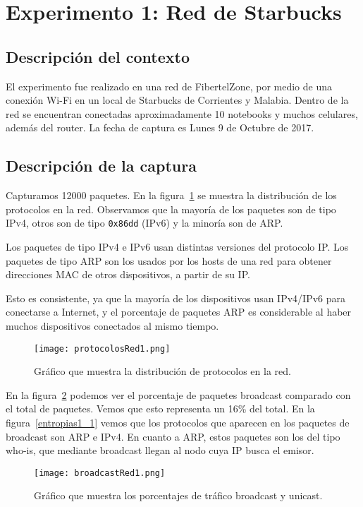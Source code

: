 \section{Experimento 1: Red de Starbucks}

\subsection{Descripción del contexto}

El experimento fue realizado en una red de FibertelZone, por medio de una conexión Wi-Fi en un local de Starbucks de Corrientes y Malabia. Dentro de la red se encuentran conectadas aproximadamente 10 notebooks y muchos celulares, además del router. La fecha de captura es Lunes 9 de Octubre de 2017.

\subsection{Descripción de la captura}

Capturamos 12000 paquetes. En la figura~\ref{protocolos1} se muestra la distribución de los protocolos en la red. Observamos que la mayoría de los paquetes son de tipo IPv4, otros son de tipo \texttt{0x86dd} (IPv6) y la minoría son de ARP.

Los paquetes de tipo IPv4 e IPv6 usan distintas versiones del protocolo IP. Los paquetes de tipo ARP son los usados por los hosts de una red para obtener direcciones MAC de otros dispositivos, a partir de su IP.

Esto es consistente, ya que la mayoría de los dispositivos usan IPv4/IPv6 para conectarse a Internet, y el porcentaje de paquetes ARP es considerable al haber muchos dispositivos conectados al mismo tiempo.

\begin{figure}[H]
\centering
\texttt{[image: protocolosRed1.png]}
\caption{Gráfico que muestra la distribución de protocolos en la red.}
\label{protocolos1}
\end{figure}

En la figura~\ref{broadcast1} podemos ver el porcentaje de paquetes broadcast comparado con el total de paquetes. Vemos que esto representa un 16\% del total. En la figura~\ref{entropias1_1} vemos que los protocolos que aparecen en los paquetes de broadcast son ARP e IPv4. En cuanto a ARP, estos paquetes son los del tipo who-is, que mediante broadcast llegan al nodo cuya IP busca el emisor. 

\begin{figure}[H]
\centering
\texttt{[image: broadcastRed1.png]}
\caption{Gráfico que muestra los porcentajes de tráfico broadcast y unicast.}
\label{broadcast1}
\end{figure}

